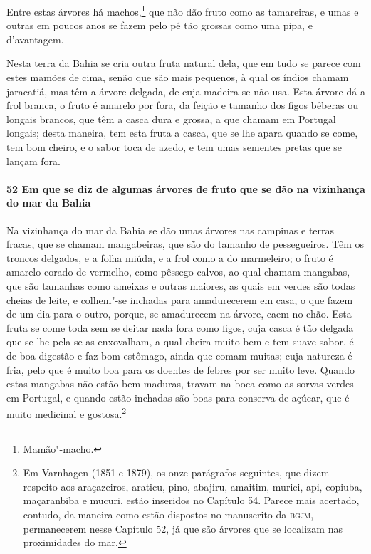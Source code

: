 Entre estas árvores há machos,\footnote{ Mamão"-macho.} que não dão fruto como as
tamareiras, e umas e outras em poucos anos se fazem pelo pé tão grossas como uma pipa, e
d'avantagem.

Nesta terra da Bahia se cria outra fruta natural dela, que em tudo se parece com estes
mamões de cima, senão que são mais pequenos, à qual os índios chamam jaracatiá, mas têm a
árvore delgada, de cuja madeira se não usa. Esta árvore dá a frol branca, o fruto é
amarelo por fora, da feição e tamanho dos figos bêberas ou longais brancos, que têm a
casca dura e grossa, a que chamam em Portugal longais; desta maneira, tem esta fruta a
casca, que se lhe apara quando se come, tem bom cheiro, e o sabor toca de azedo, e tem
umas sementes pretas que se lançam fora.

\paragraph{52 Em que se diz de algumas árvores de fruto que se dão na vizinhança do mar da
Bahia}

Na vizinhança do mar da Bahia se dão umas árvores nas campinas e terras fracas, que se
chamam mangabeiras, que são do tamanho de pessegueiros. Têm os troncos delgados, e a folha
miúda, e a frol como a do marmeleiro; o fruto é amarelo corado de vermelho, como pêssego
calvos, ao qual chamam mangabas, que são tamanhas como ameixas e outras maiores, as quais
em verdes são todas cheias de leite, e colhem"-se inchadas para amadurecerem em casa, o que
fazem de um dia para o outro, porque, se amadurecem na árvore, caem no chão. Esta fruta se
come toda sem se deitar nada fora como figos, cuja casca é tão delgada que se lhe pela se
as enxovalham, a qual cheira muito bem e tem suave sabor, é de boa digestão e faz bom
estômago, ainda que comam muitas; cuja natureza é fria, pelo que é muito boa para os
doentes de febres por ser muito leve. Quando estas mangabas não estão bem maduras, travam
na boca como as sorvas verdes em Portugal, e quando estão inchadas são boas para conserva
de açúcar, que é muito medicinal e gostosa.\footnote{ Em Varnhagen (1851 e 1879), os onze
parágrafos seguintes, que dizem respeito aos araçazeiros, araticu, pino, abajiru, amaitim,
murici, api, copiuba, maçaranbiba e mucuri, estão inseridos no Capítulo 54. Parece mais
acertado, contudo, da maneira como estão dispostos no manuscrito da \textsc{bgjm},
permanecerem nesse Capítulo 52, já que são árvores que se localizam nas proximidades do
mar.}

